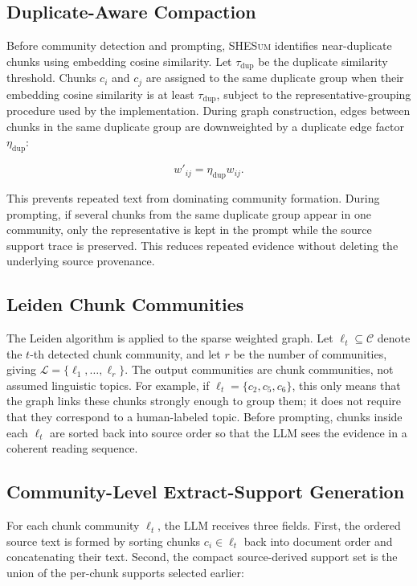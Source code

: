 \documentclass[11pt]{article}
\newcommand{\methodname}{\textsc{SHESum}}
\begin{document}
\subsection{Duplicate-Aware Compaction}

Before community detection and prompting, \methodname{} identifies near-duplicate chunks using embedding cosine similarity. Let $\tau_{\mathrm{dup}}$ be the duplicate similarity threshold. Chunks $c_i$ and $c_j$ are assigned to the same duplicate group when their embedding cosine similarity is at least $\tau_{\mathrm{dup}}$, subject to the representative-grouping procedure used by the implementation. During graph construction, edges between chunks in the same duplicate group are downweighted by a duplicate edge factor $\eta_{\mathrm{dup}}$:

\begin{equation}
w'_{ij} = \eta_{\mathrm{dup}} w_{ij}.
\end{equation}

This prevents repeated text from dominating community formation. During prompting, if several chunks from the same duplicate group appear in one community, only the representative is kept in the prompt while the source support trace is preserved. This reduces repeated evidence without deleting the underlying source provenance.


\subsection{Leiden Chunk Communities}

The Leiden algorithm \citep{traag-2019-leiden} is applied to the sparse weighted graph. Let $\ell_t \subseteq \mathcal{C}$ denote the $t$-th detected chunk community, and let $r$ be the number of communities, giving $\mathcal{L}=\{\ell_1,\ldots,\ell_r\}$. The output communities are chunk communities, not assumed linguistic topics. For example, if $\ell_t=\{c_2,c_5,c_6\}$, this only means that the graph links these chunks strongly enough to group them; it does not require that they correspond to a human-labeled topic. Before prompting, chunks inside each $\ell_t$ are sorted back into source order so that the LLM sees the evidence in a coherent reading sequence.

\subsection{Community-Level Extract-Support Generation}

For each chunk community $\ell_t$, the LLM receives three fields. First, the ordered source text is formed by sorting chunks $c_i \in \ell_t$ back into document order and concatenating their text. Second, the compact source-derived support set is the union of the per-chunk supports selected earlier:
\end{document}
